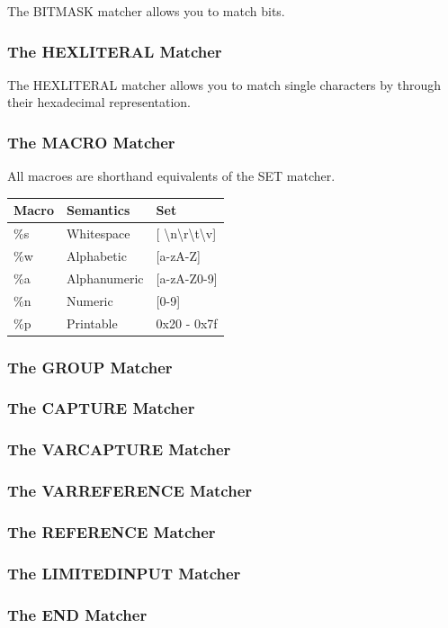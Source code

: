 The BITMASK matcher allows you to match bits.

\subsubsection{The HEXLITERAL Matcher}

The HEXLITERAL matcher allows you to match single characters by
through their hexadecimal representation.

\subsubsection{The MACRO Matcher}

All macroes are shorthand equivalents of the SET matcher.

\begin{center}
\label{tab:naig_macroes}
\begin{longtable}{lll}
\textbf{Macro} & \textbf{Semantics} & \textbf{Set} \\
\endhead
\%s & Whitespace & [ \textbackslash n\textbackslash r\textbackslash t\textbackslash v] \\
\%w & Alphabetic & [a-zA-Z] \\
\%a & Alphanumeric & [a-zA-Z0-9] \\
\%n & Numeric & [0-9] \\
\%p & Printable & 0x20 - 0x7f \\
\end{longtable}
\end{center}

\subsubsection{The GROUP Matcher}

\subsubsection{The CAPTURE Matcher}

\subsubsection{The VARCAPTURE Matcher}

\subsubsection{The VARREFERENCE Matcher}

\subsubsection{The REFERENCE Matcher}

\subsubsection{The LIMITEDINPUT Matcher}

\subsubsection{The END Matcher}

